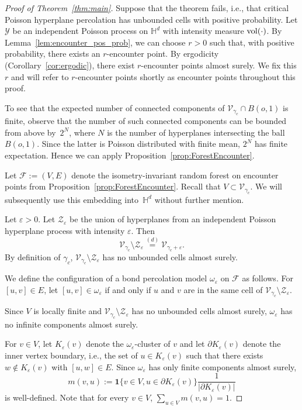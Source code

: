 \documentclass[12pt,a4paper]{article}
\theoremstyle{definition}
\begin{document}
\begin{proof}[Proof of Theorem~\ref{thm:main}] Suppose that the theorem fails, i.e., that critical Poisson hyperplane percolation has unbounded cells with positive probability. Let $\mathcal Y$ be an independent Poisson process on $\mathbb H^d$ with intensity measure ${\rm vol}(\cdot)$. By Lemma~\ref{lem:encounter_pos_prob}, we can choose $r>0$ such that, with positive probability, there exists an $r$-encounter point. By ergodicity (Corollary~\ref{cor:ergodic}), there exist $r$-encounter points almost surely. We fix this $r$ and will refer to $r$-encounter points shortly as encounter points throughout this proof. 

To see that the expected number of connected components of $\mathcal{V}_{\gamma_c} \cap B(o,1)$ is finite,
observe that the number of such connected components can be bounded from above by~$2^N$, where $N$ is the number of hyperplanes intersecting the ball $B(o,1)$. Since the latter is Poisson distributed with finite mean, $2^N$ has finite expectation.
Hence we can apply Proposition~\ref{prop:ForestEncounter}.

Let $\mathcal F:=(V,E)$ denote the isometry-invariant random forest on encounter points from Proposition~\ref{prop:ForestEncounter}. Recall that $V\subset \mathcal V_{\gamma_c}$. We will subsequently use this embedding into~$\mathbb H^d$ without further mention.

Let $\varepsilon>0$. Let $\mathcal Z_\varepsilon$ be the union of hyperplanes from an independent Poisson hyperplane process with intensity $\varepsilon$. Then 
$$
\mathcal V_{\gamma_c} \setminus \mathcal Z_\varepsilon \overset{(d)}{=} \mathcal V_{\gamma_c+\varepsilon}.
$$
By definition of $\gamma_c$, $\mathcal V_{\gamma_c} \setminus \mathcal Z_\varepsilon$ has no unbounded cells almost surely.

 We define the configuration of a bond percolation model $\omega_\varepsilon$ on $\mathcal F$ as follows. For $[u,v]\in E$, let $[u,v]\in\omega_\varepsilon$ if and only if $u$ and $v$ are in the same cell of $\mathcal V_{\gamma_c} \setminus \mathcal Z_\varepsilon$. 

Since $V$ is locally finite and $\mathcal V_{\gamma_c} \setminus \mathcal Z_\varepsilon$ has no unbounded cells almost surely, $\omega_\varepsilon$ has no infinite components almost surely. 

For $v\in V$, let $K_{\varepsilon}(v)$ denote the $\omega_{\varepsilon}$-cluster of $v$ and let $\partial K_{\varepsilon}(v)$ denote the inner vertex boundary, i.e., the set of $u\in K_{\varepsilon}(v)$ such that there exists $w\notin K_{\varepsilon}(v)$ with $[u,w]\in E$. Since $\omega_{\varepsilon}$ has only finite components almost surely,
$$
m(v,u):=\mathbf 1\{v\in V, u\in \partial K_{\varepsilon}(v)\} \frac{1}{|\partial K_{\varepsilon}(v)|}
$$
is well-defined. Note that for every $v\in V$, $\sum_{u\in V} m(v,u)=1$. 


\end{proof}
\end{document}
